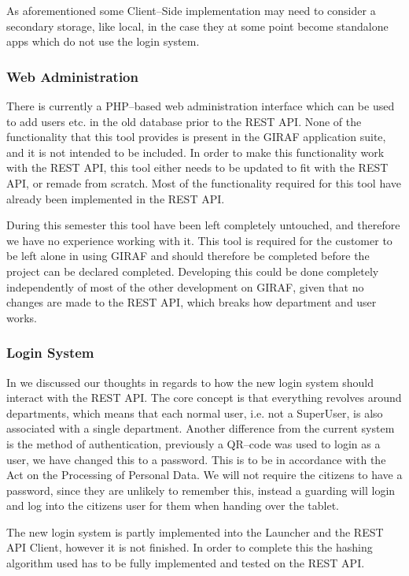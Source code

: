As aforementioned some Client--Side implementation may need to consider a secondary storage, like local, in the case they at some point become standalone apps which do not use the login system.

\subsubsection*{Web Administration}
There is currently a PHP--based web administration interface which can be used to add users etc. in the old database prior to the REST API.
None of the functionality that this tool provides is present in the GIRAF application suite, and it is not intended to be included.
In order to make this functionality work with the REST API, this tool either needs to be updated to fit with the REST API, or remade from scratch.
Most of the functionality required for this tool have already been implemented in the REST API.

During this semester this tool have been left completely untouched, and therefore we have no experience working with it.
This tool is required for the customer to be left alone in using GIRAF and should therefore be completed before the project can be declared completed.
Developing this could be done completely independently of most of the other development on GIRAF, given that no changes are made to the REST API, which breaks how department and user works.

\subsubsection*{Login System}
In  we discussed our thoughts in regards to how the new login system should interact with the REST API.
The core concept is that everything revolves around departments, which means that each normal user, i.e. not a SuperUser, is also associated with a single department.
Another difference from the current system is the method of authentication, previously a QR--code was used to login as a user, we have changed this to a password.
This is to be in accordance with the Act on the Processing of Personal Data.
We will not require the citizens to have a password, since they are unlikely to remember this, instead a guarding will login and log into the citizens user for them when handing over the tablet.

The new login system is partly implemented into the Launcher and the REST API Client, however it is not finished.
In order to complete this the hashing algorithm used has to be fully implemented and tested on the REST API.

